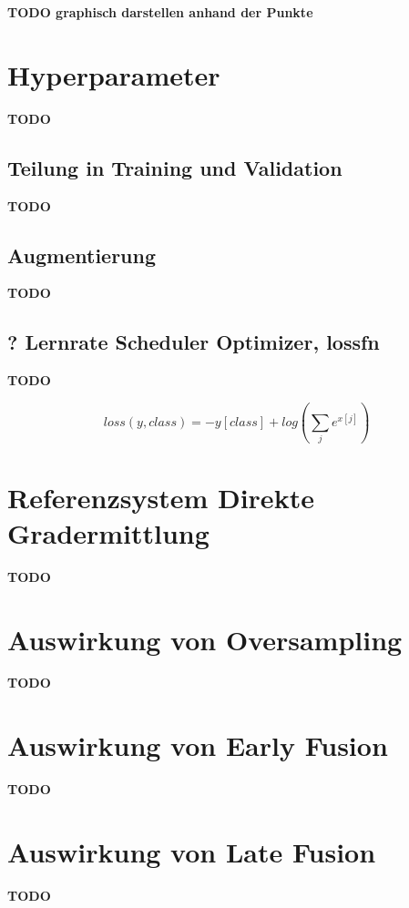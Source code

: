 \textbf{TODO graphisch darstellen anhand der Punkte}


\clearpage
\section{Hyperparameter}\label{hyper}
\textbf{TODO}

\subsection{Teilung in Training und Validation}\label{split}
\textbf{TODO}

\subsection{Augmentierung}\label{augmentation}
\textbf{TODO}

\subsection{? Lernrate Scheduler Optimizer, lossfn}\label{lrate}
\textbf{TODO}

\begin{equation}
 loss(y, class) = - y[class] + log( \sum_{j}^{} e^{x[j]} )
\end{equation}


\section{Referenzsystem Direkte Gradermittlung}\label{directgrade}
\textbf{TODO}


\section{Auswirkung von Oversampling}\label{oversampling}
\textbf{TODO}

\section{Auswirkung von Early Fusion}\label{earlyfusion}
\textbf{TODO}

\section{Auswirkung von Late Fusion}\label{latefusion}
\textbf{TODO}










